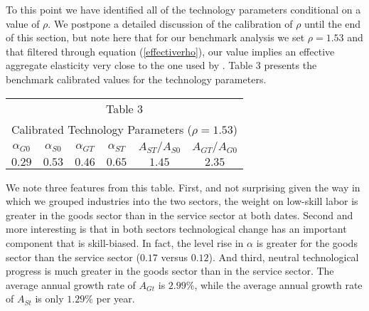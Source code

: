 \documentclass[12pt,english]{article}
\begin{document}
{\normalsize To this point we have identified all of the technology
parameters conditional on a value of $\rho $. We postpone a detailed
discussion of the calibration of $\rho $ until the end of this section, but
note here that for our benchmark analysis we set $\rho =1.53$ and that
filtered through equation (\ref{effectiverho}), our value implies an
effective aggregate elasticity very close to the one used by \citet{KatMur92}%
. Table 3 presents the benchmark calibrated values for the technology
parameters.\newline
%
}

\begin{center}
{\normalsize {\small 
\begin{tabular}{cccccc}
\multicolumn{6}{c}{Table 3} \\ 
\multicolumn{6}{c}{Calibrated Technology Parameters ($\rho =1.53$)} \\ \hline
$\alpha _{G0}$ & $\alpha _{S0}$ & $\alpha _{GT}$ & $\alpha _{ST}$ & $%
A_{ST}/A_{S0}$ & $A_{GT}/A_{G0}$ \\ \hline
$0.29$ & $0.53$ & $0.46$ & $0.65$ & $1.45$ & $2.35$ \\ \hline
\end{tabular}
} }
\end{center}

{\normalsize We note three features from this table. First, and not
surprising given the way in which we grouped industries into the two
sectors, the weight on low-skill labor is greater in the goods sector than
in the service sector at both dates. Second and more interesting is that in
both sectors technological change has an important component that is
skill-biased. In fact, the level rise in $\alpha $ is greater for the goods
sector than the service sector ($0.17$ versus $0.12$). And third, neutral
technological progress is much greater in the goods sector than in the
service sector. The average annual growth rate of $A_{Gt}$ is $2.99\%$,
while the average annual growth rate of $A_{St}$ is only $1.29\%$ per year. }
\end{document}
